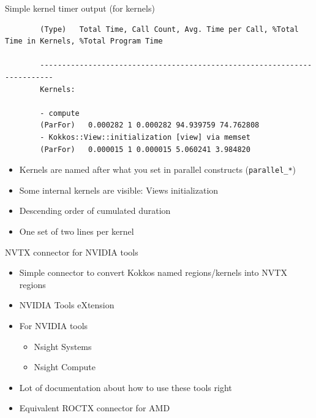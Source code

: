 \documentclass[
    aspectratio=169,
]{beamer}
\begin{document}
\begin{frame}[fragile]{Simple kernel timer output (for kernels)}
    \begin{verbatim}
        (Type)   Total Time, Call Count, Avg. Time per Call, %Total Time in Kernels, %Total Program Time

        -------------------------------------------------------------------------
        Kernels:

        - compute
        (ParFor)   0.000282 1 0.000282 94.939759 74.762808
        - Kokkos::View::initialization [view] via memset
        (ParFor)   0.000015 1 0.000015 5.060241 3.984820
    \end{verbatim}

    \begin{itemize}
        \item Kernels are named after what you set in parallel constructs (\texttt{parallel\_*})
        \item Some internal kernels are visible: Views initialization
        \item Descending order of cumulated duration
        \item One set of two lines per kernel
    \end{itemize}
\end{frame}

\begin{frame}{NVTX connector for NVIDIA tools}
    \begin{itemize}
        \item Simple connector to convert Kokkos named regions/kernels into NVTX regions
        \item NVIDIA Tools eXtension
        \item For NVIDIA tools
        \begin{itemize}
            \item Nsight Systems
            \item Nsight Compute
        \end{itemize}
        \item Lot of documentation about how to use these tools right
        \item Equivalent ROCTX connector for AMD
    \end{itemize}
\end{frame}
\end{document}
